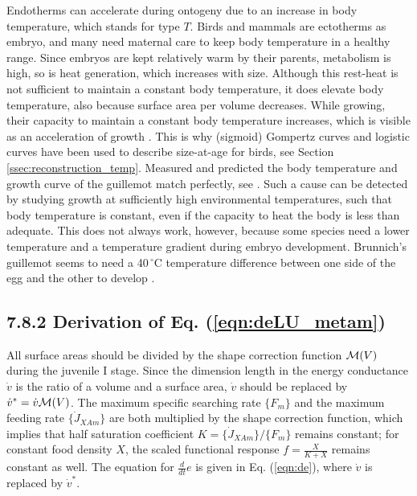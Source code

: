 Endotherms can accelerate during ontogeny due to an increase in body temperature, which stands for type $T$.
Birds and mammals are ectotherms as embryo, and many need maternal care to keep body temperature in a healthy range.
Since embryos are kept relatively warm by their parents, metabolism is high, so is heat generation, which increases with size.
Although this rest-heat is not sufficient to maintain a constant body temperature, it does elevate body temperature, also because surface area per volume decreases.
While growing, their capacity to maintain a constant body temperature increases, which is visible as an acceleration of growth \cite{Kooy94a}.
This is why (sigmoid) Gompertz curves and logistic curves have been used to describe size-at-age for birds, see Section \ref{ssec:reconstruction_temp}.
Measured and predicted the body temperature and growth curve of the guillemot match perfectly, see \cite[Figure 4.28]{Kooy2010}. 
Such a cause can be detected by studying growth at sufficiently high environmental temperatures, such that body temperature is constant, even if the capacity to heat the body is less than adequate.
This does not always work, however, because some species need a lower temperature and a temperature gradient during embryo development.
Brunnich's guillemot seems to need a 40\,$^{\circ}$C temperature difference between one side of the egg and the other to develop \cite{Remm80}.


\subsection*{7.8.2 Derivation of Eq. (\ref{eqn:deLU_metam})}
{}
\label{sec_c:metamorphosis}

All surface areas should be divided by the shape correction function ${\cal M}(V)$ during the juvenile I stage.
Since the dimension length in the energy conductance $\dot{v}$ is the ratio of a volume and a surface area, $\dot{v}$ should be replaced by $\dot{v}^* = \dot{v} {\cal M}(V)$.
The maximum specific searching rate $\{F_m\}$ and the maximum feeding rate $\{\dot{J}_{XAm}\}$ are both multiplied by the shape correction function, which implies that half saturation coefficient $K = \{\dot{J}_{XAm}\}/ \{F_m\}$ remains constant; 
for constant food density $X$, the scaled functional response $f = \frac{X} {K + X}$ remains constant as well.
The equation for $\frac{d}{dt} e$ is given in Eq. (\ref{eqn:de}), where $\dot{v}$ is replaced by $\dot{v}^*$.

